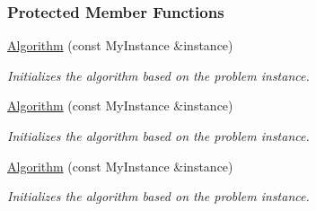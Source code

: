 \subsubsection*{Protected Member Functions}
\begin{DoxyCompactItemize}
\item 
\hyperlink{structalgorithm_1_1Algorithm_a49efc6711c3e2448647a9630cdabc23b}{Algorithm} (const My\+Instance \&instance)
\begin{DoxyCompactList}\small\item\em Initializes the algorithm based on the problem instance. \end{DoxyCompactList}\item 
\hyperlink{structalgorithm_1_1Algorithm_a49efc6711c3e2448647a9630cdabc23b}{Algorithm} (const My\+Instance \&instance)
\begin{DoxyCompactList}\small\item\em Initializes the algorithm based on the problem instance. \end{DoxyCompactList}\item 
\hyperlink{structalgorithm_1_1Algorithm_a49efc6711c3e2448647a9630cdabc23b}{Algorithm} (const My\+Instance \&instance)
\begin{DoxyCompactList}\small\item\em Initializes the algorithm based on the problem instance. \end{DoxyCompactList}\end{DoxyCompactItemize}
